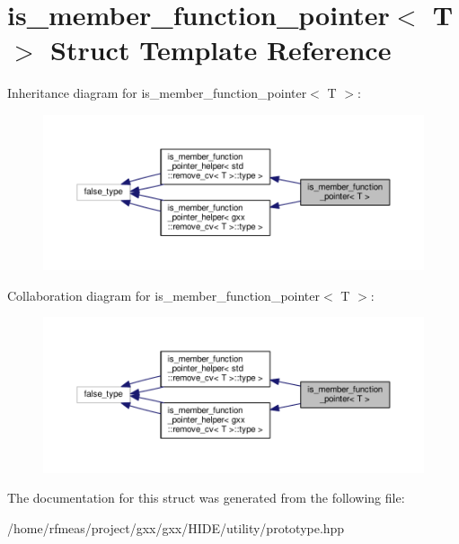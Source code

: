 \hypertarget{structis__member__function__pointer}{}\section{is\+\_\+member\+\_\+function\+\_\+pointer$<$ T $>$ Struct Template Reference}
\label{structis__member__function__pointer}


Inheritance diagram for is\+\_\+member\+\_\+function\+\_\+pointer$<$ T $>$\+:
\nopagebreak
\begin{figure}[H]
\begin{center}
\leavevmode
\includegraphics[width=350pt]{structis__member__function__pointer__inherit__graph}
\end{center}
\end{figure}


Collaboration diagram for is\+\_\+member\+\_\+function\+\_\+pointer$<$ T $>$\+:
\nopagebreak
\begin{figure}[H]
\begin{center}
\leavevmode
\includegraphics[width=350pt]{structis__member__function__pointer__coll__graph}
\end{center}
\end{figure}


The documentation for this struct was generated from the following file\+:\begin{DoxyCompactItemize}
\item 
/home/rfmeas/project/gxx/gxx/\+H\+I\+D\+E/utility/prototype.\+hpp\end{DoxyCompactItemize}
